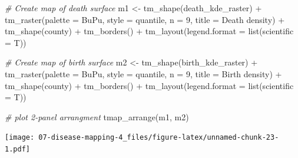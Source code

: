 \documentclass[
]{book}
\newenvironment{Shaded}{\begin{snugshade}}{\end{snugshade}}
\newcommand{\AttributeTok}[1]{\textcolor[rgb]{0.77,0.63,0.00}{#1}}
\newcommand{\CommentTok}[1]{\textcolor[rgb]{0.56,0.35,0.01}{\textit{#1}}}
\newcommand{\DecValTok}[1]{\textcolor[rgb]{0.00,0.00,0.81}{#1}}
\newcommand{\FunctionTok}[1]{\textcolor[rgb]{0.00,0.00,0.00}{#1}}
\newcommand{\NormalTok}[1]{#1}
\newcommand{\OtherTok}[1]{\textcolor[rgb]{0.56,0.35,0.01}{#1}}
\newcommand{\SpecialCharTok}[1]{\textcolor[rgb]{0.00,0.00,0.00}{#1}}
\newcommand{\StringTok}[1]{\textcolor[rgb]{0.31,0.60,0.02}{#1}}
\begin{document}
\begin{Shaded}
\begin{Highlighting}[]
\CommentTok{\# Create map of death surface}
\NormalTok{m1 }\OtherTok{\textless{}{-}} \FunctionTok{tm\_shape}\NormalTok{(death\_kde\_raster) }\SpecialCharTok{+} 
  \FunctionTok{tm\_raster}\NormalTok{(}\AttributeTok{palette =} \StringTok{\textquotesingle{}BuPu\textquotesingle{}}\NormalTok{,}
            \AttributeTok{style =} \StringTok{\textquotesingle{}quantile\textquotesingle{}}\NormalTok{,}
            \AttributeTok{n =} \DecValTok{9}\NormalTok{,}
            \AttributeTok{title =} \StringTok{\textquotesingle{}Death density\textquotesingle{}}\NormalTok{) }\SpecialCharTok{+}
  \FunctionTok{tm\_shape}\NormalTok{(county) }\SpecialCharTok{+}
    \FunctionTok{tm\_borders}\NormalTok{() }\SpecialCharTok{+} 
  \FunctionTok{tm\_layout}\NormalTok{(}\AttributeTok{legend.format =} \FunctionTok{list}\NormalTok{(}\AttributeTok{scientific =}\NormalTok{ T))}

\CommentTok{\# Create map of birth surface}
\NormalTok{m2 }\OtherTok{\textless{}{-}} \FunctionTok{tm\_shape}\NormalTok{(birth\_kde\_raster) }\SpecialCharTok{+}
  \FunctionTok{tm\_raster}\NormalTok{(}\AttributeTok{palette =} \StringTok{\textquotesingle{}BuPu\textquotesingle{}}\NormalTok{,}
            \AttributeTok{style =} \StringTok{\textquotesingle{}quantile\textquotesingle{}}\NormalTok{,}
            \AttributeTok{n =} \DecValTok{9}\NormalTok{,}
            \AttributeTok{title =} \StringTok{\textquotesingle{}Birth density\textquotesingle{}}\NormalTok{) }\SpecialCharTok{+}
  \FunctionTok{tm\_shape}\NormalTok{(county) }\SpecialCharTok{+}
    \FunctionTok{tm\_borders}\NormalTok{() }\SpecialCharTok{+} 
  \FunctionTok{tm\_layout}\NormalTok{(}\AttributeTok{legend.format =} \FunctionTok{list}\NormalTok{(}\AttributeTok{scientific =}\NormalTok{ T))}

\CommentTok{\# plot 2{-}panel arrangment}
\FunctionTok{tmap\_arrange}\NormalTok{(m1, m2)}
\end{Highlighting}
\end{Shaded}

\texttt{[image: 07-disease-mapping-4\_files/figure-latex/unnamed-chunk-23-1.pdf]}
\end{document}
